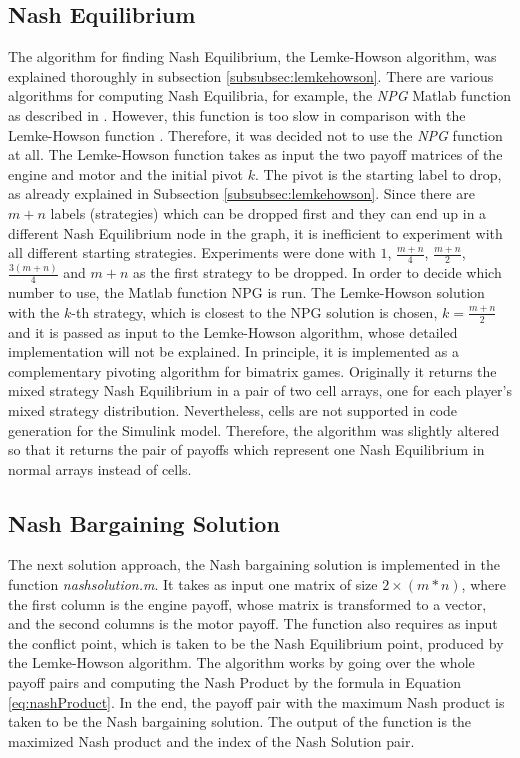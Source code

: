 \subsection{Nash Equilibrium}
The algorithm for finding Nash Equilibrium, the Lemke-Howson algorithm, was explained thoroughly in subsection \ref{subsubsec:lemkehowson}. There are various algorithms for computing Nash Equilibria, for example, the \textit{NPG} Matlab function as described in \citet{npg}. However, this function is too slow in comparison with the Lemke-Howson function \citep{lemkeHowson2014Matlab}. Therefore, it was decided not to use the \textit{NPG} function at all. The Lemke-Howson function takes as input the two payoff matrices of the engine and motor and the initial pivot $k$. The pivot is the starting label to drop, as already explained in Subsection \ref{subsubsec:lemkehowson}. Since there are $m+n$ labels (strategies) which can be dropped first and they can end up in a different Nash Equilibrium node in the graph, it is inefficient to experiment with all different starting strategies. Experiments were done with $1$, $\frac{m+n}{4}$, $\frac{m+n}{2}$, $\frac{3(m+n)}{4}$ and $m+n$ as the first strategy to be dropped. In order to decide which number to use, the Matlab function NPG is run. The Lemke-Howson solution with the $k$-th strategy, which is closest to the NPG solution is chosen, $k = \frac{m+n}{2}$ and it is passed as input to the Lemke-Howson algorithm, whose detailed implementation will not be explained. In principle, it is implemented as a complementary pivoting algorithm for bimatrix games. Originally it returns the mixed strategy Nash Equilibrium in a pair of two cell arrays, one for each player's mixed strategy distribution. Nevertheless, cells are not supported in code generation for the Simulink model. Therefore, the algorithm was slightly altered so that it returns the pair of payoffs which represent one Nash Equilibrium in normal arrays instead of cells.

\subsection{Nash Bargaining Solution}
The next solution approach, the Nash bargaining solution is implemented in the function \textit{nashsolution.m}. It takes as input one matrix of size $2 \times (m*n)$, where the first column is the engine payoff, whose matrix is transformed to a vector, and the second columns is the motor payoff. The function also requires as input the conflict point, which is taken to be the Nash Equilibrium point, produced by the Lemke-Howson algorithm. The algorithm works by going over the whole payoff pairs and computing the Nash Product by the formula in Equation \ref{eq:nashProduct}. In the end, the payoff pair with the maximum Nash product is taken to be the Nash bargaining solution. The output of the function is the maximized Nash product and the index of the Nash Solution pair.

